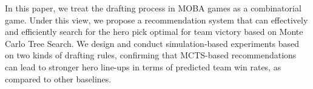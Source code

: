 In this paper, we treat the drafting process in MOBA games as a combinatorial game. Under this view, we propose a recommendation system that can effectively and efficiently search for the hero pick optimal for team victory based on Monte Carlo Tree Search. We design and conduct simulation-based experiments based on two kinds of drafting rules, confirming that MCTS-based recommendations can lead to stronger hero line-ups in terms of predicted team win rates, as compared to other baselines.


